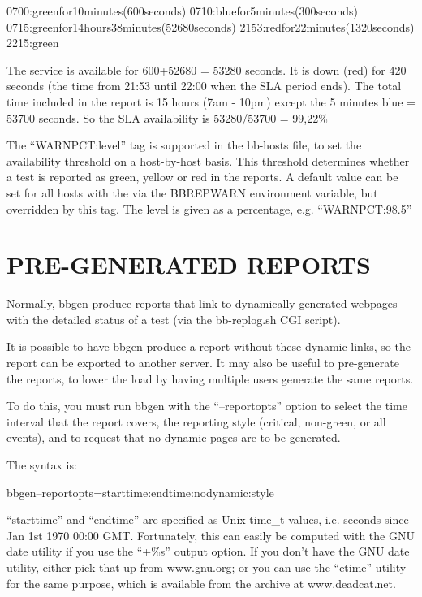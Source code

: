   
0700:greenfor10minutes(600seconds)  
0710:bluefor5minutes(300seconds)  
0715:greenfor14hours38minutes(52680seconds)  
2153:redfor22minutes(1320seconds)  
2215:green 


  The service is available for 600+52680 = 53280 seconds. It is down
  (red) for 420 seconds (the time from 21:53 until 22:00 when the SLA
  period ends). The total time included in the report is 15 hours (7am
  - 10pm) except the 5 minutes blue = 53700 seconds. So the SLA
  availability is 53280/53700 = 99,22\% 



  The ``WARNPCT:level'' tag is supported in the bb-hosts file, to set
  the availability threshold on a host-by-host basis. This threshold
  determines whether a test is reported as green, yellow or red in the
  reports. A default value can be set for all hosts with the via the
  BBREPWARN environment variable, but overridden by this tag. The
  level is given as a percentage, e.g. ``WARNPCT:98.5'' 

 
\section{PRE-GENERATED REPORTS}
 Normally, bbgen produce reports that link to dynamically generated webpages with the detailed status of a test (via the bb-replog.sh CGI script). 

  It is possible to have bbgen produce a report without these dynamic
  links, so the report can be exported to another server. It may also
  be useful to pre-generate the reports, to lower the load by having
  multiple users generate the same reports. 



  To do this, you must run bbgen with the ``--reportopts'' option to
  select the time interval that the report covers, the reporting style
  (critical, non-green, or all events), and to request that no dynamic
  pages are to be generated. 



  The syntax is: 


  
bbgen--reportopts=starttime:endtime:nodynamic:style 


  ``starttime'' and ``endtime'' are specified as Unix time\_t values,
  i.e. seconds since Jan 1st 1970 00:00 GMT. Fortunately, this can
  easily be computed with the GNU date utility if you use the ``+\%s''
  output option. If you don't have the GNU date utility, either pick
  that up from www.gnu.org; or you can use the ``etime'' utility for
  the same purpose, which is available from the archive at
  www.deadcat.net. 



